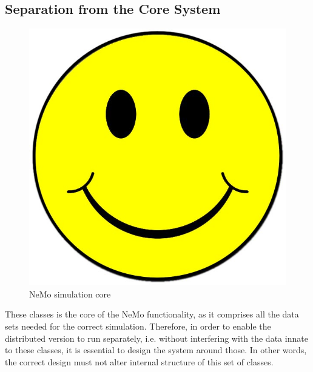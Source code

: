 \subsection{Separation from the Core System}

\begin{figure}[h]
\begin{center}
\includegraphics[scale = 0.1]{images/placeholder.jpg}
\end{center}
\caption{NeMo simulation core}
\end{figure}

These classes is the core of the NeMo functionality, as it comprises all the data sets needed for the correct simulation. Therefore, in order to enable the distributed version to run separately, i.e. without interfering with the data innate to these classes, it is essential to design the system around those. In other words, the correct design must not alter internal structure of this set of classes.

